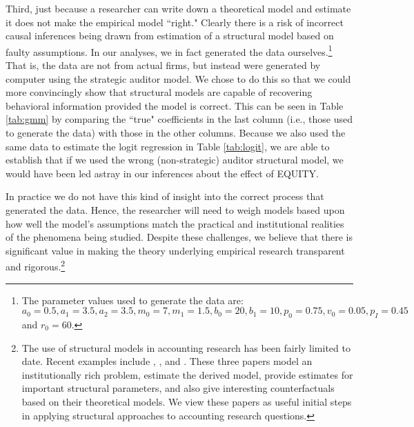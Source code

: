 Third, just because a researcher can write down a theoretical model and estimate it does not make the empirical model ``right."
Clearly there is a risk of incorrect causal inferences being drawn from estimation of a structural model based on faulty assumptions.
In our analyses, we in fact generated the data ourselves.\footnote{The parameter values used to generate the data are: $a_0 = 0.5 , a_1 = 3.5 , a_2 = 3.5,
m_0 = 7, m_1 = 1.5, b_0 = 20, b_1 = 10, p_0 =0.75,
v_0 = 0.05, p_I = 0.45$ and $r_0 = 60.$}
That is, the data are not from actual firms, but instead were generated by computer using the strategic auditor model. 
We chose to do this so that we could more convincingly show that structural models are capable of recovering behavioral information provided the model is correct.
This can be seen in Table \ref{tab:gmm} by comparing the ``true" coefficients in the last column (i.e., those used to generate the data) with those in the other columns.
Because we also used the same data to estimate the logit regression in Table \ref{tab:logit}, we are able to establish that if we used the wrong (non-strategic) auditor structural model, we would have been led astray in our inferences about the effect of EQUITY.

In practice we do not have this kind of insight into the correct process that generated the data.
Hence, the researcher will need to weigh models based upon how well the model's assumptions match the practical and institutional realities of the phenomena being studied.
Despite these challenges, we believe that there is significant value in making the theory underlying empirical research transparent and rigorous.\footnote{The use of structural models in accounting research has been fairly limited to date.  
Recent examples include \citet{Gerakos:2013cl}, \citet{Zakolyukina:2015aa}, and \citet{Bertomeu:2015aa}.  
These three papers model an institutionally rich problem, estimate the derived model, provide estimates for important structural parameters, and also give interesting counterfactuals based on their theoretical models. 
We view these papers as useful initial steps in applying structural approaches to accounting research questions.}

